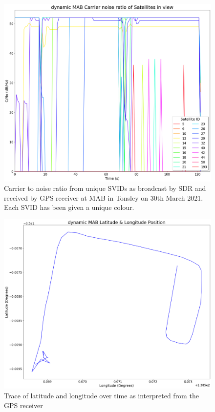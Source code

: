 \begin{figure}[H]
    \begin{centering}
        \includegraphics[width=12cm,keepaspectratio]{Figures/2021_3_30_dynamic_MAB Carrier noise ratio.png}
        \caption{Carrier to noise ratio from unique SVIDs as broadcast by SDR and received by GPS receiver at MAB in Tonsley on 30th March 2021. Each SVID has been given a unique colour.}
        \label{fig:MABdynamicCNo}
    \end{centering}
\end{figure}

\begin{figure}[H]
    \begin{centering}
        \includegraphics[width=12cm,keepaspectratio]{Figures/2021_3_30_dynamic_MAB Lat long position.png}
        \caption{Trace of latitude and longitude over time as interpreted from the GPS receiver}
        \label{fig:MABdynamicCoord}
    \end{centering}
\end{figure}

